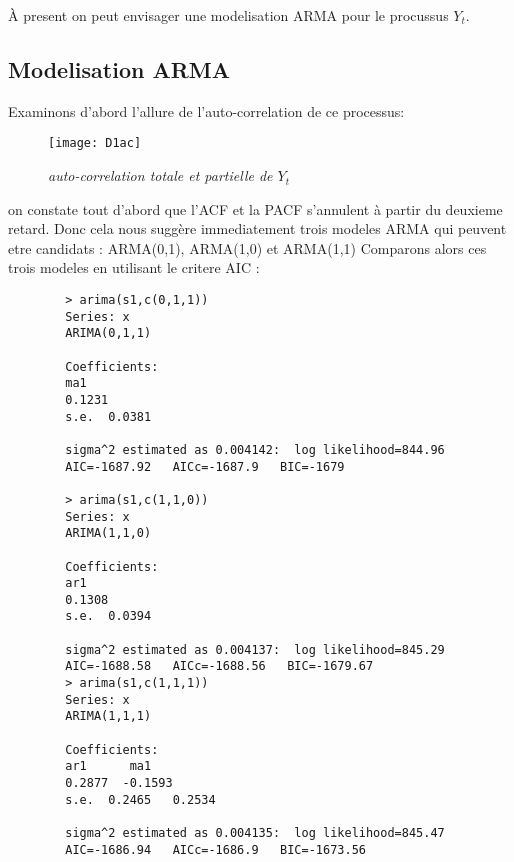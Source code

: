         À present on peut envisager une modelisation ARMA pour le procussus
        $Y_t$.
    \subsection{Modelisation ARMA}        
        
        Examinons d'abord l'allure de l'auto-correlation de ce processus:
        \begin{figure}[H]
            \centering 
            \label{fig:D1ac} 
            \texttt{[image: D1ac]} 
            \caption{\it auto-correlation totale et partielle de $Y_t$ } 
        \end{figure} 

        on constate tout d'abord que l'ACF et la PACF s'annulent à partir du
        deuxieme
        retard. Donc cela nous suggère immediatement trois modeles ARMA qui peuvent
        etre candidats : ARMA(0,1), ARMA(1,0) et ARMA(1,1)
        Comparons alors ces trois modeles en utilisant le critere AIC :

        \begin{verbatim}
        > arima(s1,c(0,1,1))
        Series: x 
        ARIMA(0,1,1)                    

        Coefficients:
        ma1
        0.1231
        s.e.  0.0381

        sigma^2 estimated as 0.004142:  log likelihood=844.96
        AIC=-1687.92   AICc=-1687.9   BIC=-1679

        > arima(s1,c(1,1,0))
        Series: x 
        ARIMA(1,1,0)                    

        Coefficients:
        ar1
        0.1308
        s.e.  0.0394

        sigma^2 estimated as 0.004137:  log likelihood=845.29
        AIC=-1688.58   AICc=-1688.56   BIC=-1679.67
        > arima(s1,c(1,1,1))
        Series: x 
        ARIMA(1,1,1)                    

        Coefficients:
        ar1      ma1
        0.2877  -0.1593
        s.e.  0.2465   0.2534

        sigma^2 estimated as 0.004135:  log likelihood=845.47
        AIC=-1686.94   AICc=-1686.9   BIC=-1673.56
        \end{verbatim}

